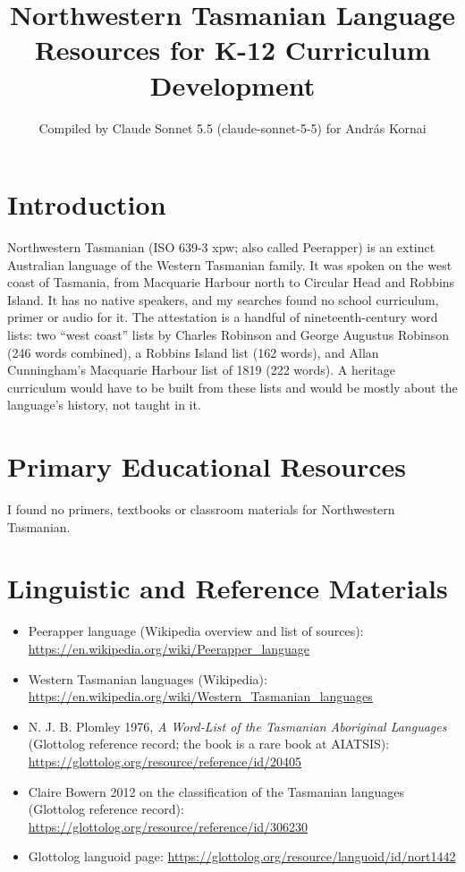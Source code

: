 \documentclass[12pt]{article}
\title{Northwestern Tasmanian Language Resources for K-12 Curriculum Development}
\author{Compiled by Claude Sonnet 5.5 (claude-sonnet-5-5) for Andr\'as Kornai}
\date{}
\begin{document}
\maketitle

\section{Introduction}
Northwestern Tasmanian (ISO 639-3 xpw; also called Peerapper) is an extinct Australian language of the Western Tasmanian family. It was spoken on the west coast of Tasmania, from Macquarie Harbour north to Circular Head and Robbins Island. It has no native speakers, and my searches found no school curriculum, primer or audio for it. The attestation is a handful of nineteenth-century word lists: two ``west coast'' lists by Charles Robinson and George Augustus Robinson (246 words combined), a Robbins Island list (162 words), and Allan Cunningham's Macquarie Harbour list of 1819 (222 words). A heritage curriculum would have to be built from these lists and would be mostly about the language's history, not taught in it.

\section{Primary Educational Resources}
I found no primers, textbooks or classroom materials for Northwestern Tasmanian.

\section{Linguistic and Reference Materials}
\begin{itemize}
\item Peerapper language (Wikipedia overview and list of sources): \url{https://en.wikipedia.org/wiki/Peerapper_language}
\item Western Tasmanian languages (Wikipedia): \url{https://en.wikipedia.org/wiki/Western_Tasmanian_languages}
\item N. J. B. Plomley 1976, \textit{A Word-List of the Tasmanian Aboriginal Languages} (Glottolog reference record; the book is a rare book at AIATSIS): \url{https://glottolog.org/resource/reference/id/20405}
\item Claire Bowern 2012 on the classification of the Tasmanian languages (Glottolog reference record): \url{https://glottolog.org/resource/reference/id/306230}
\item Glottolog languoid page: \url{https://glottolog.org/resource/languoid/id/nort1442}
\end{itemize}
\end{document}
